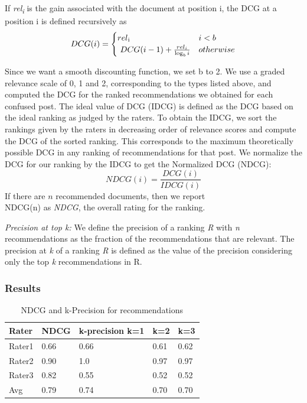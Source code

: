 \documentclass{edm_template}
\begin{document}
If \textit{rel\textsubscript i} is the gain associated with the document at position i, the DCG at a position i is defined recursively as
\begin{equation}
DCG(i) =
\begin{cases}
rel \textsubscript i & i < b  \\
\ DCG(i-1) + \frac{rel_i}{\log_b{i}} & otherwise \\
\end{cases}
\end{equation}

Since we want a smooth discounting function, we set b to 2. We use a graded relevance scale of 0, 1 and 2, corresponding to the types listed above, and computed the DCG for the ranked recommendations we obtained for each confused post. The ideal value of DCG (IDCG) is defined as the DCG based on the ideal ranking as judged by the raters. To obtain the IDCG, we sort the rankings given by the raters in decreasing order of relevance scores and compute the DCG of the sorted ranking. This corresponds to the maximum theoretically possible DCG in any ranking of recommendations for that post. We normalize the DCG for our ranking by the IDCG to get the Normalized DCG (NDCG):
\begin{equation}
NDCG(i) = \frac{DCG(i)}{IDCG(i)}
\end{equation}
If there are $n$ recommended documents, then we report\\NDCG(n) as \emph{NDCG}, the overall rating for the ranking. 

\textit{Precision at top k:}
We define the precision of a ranking \textit{R} with \textit{n} recommendations as the fraction of the recommendations that are relevant. The precision at \textit{k} of a ranking \textit{R} is defined as the value of the precision considering only the top \textit{k} recommendations in R. 

\subsubsection{Results}
\begin{table}
    \begin{tabular}{|l|l|l|l|l|}
    \hline
    Rater  & NDCG & k-precision k=1 & k=2  & k=3  \\ \hline
    Rater1 & 0.66 & 0.66            & 0.61 & 0.62 \\ \hline
    Rater2 & 0.90 & 1.0             & 0.97 & 0.97 \\ \hline
    Rater3 & 0.82 & 0.55            & 0.52 & 0.52 \\ \hline
    Avg    & 0.79 & 0.74            & 0.70 & 0.70 \\ \hline
    \end{tabular}
    \vspace{-5pt}
    \caption {NDCG and k-Precision for recommendations}
\label{table:ndcg}
\end{table}
\end{document}
